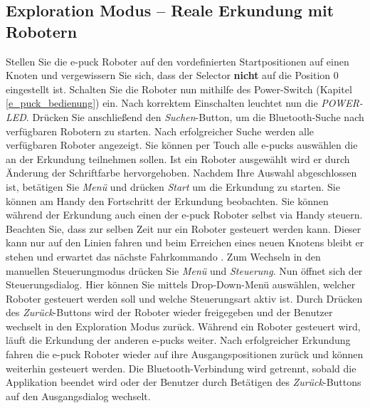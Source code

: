 \documentclass[10pt,a4paper]{article}
\begin{document}
	\subsection{Exploration Modus -- Reale Erkundung mit Robotern}
	\label{subsec:reale_erkundung}
		Stellen Sie die e-puck Roboter auf den vordefinierten Startpositionen auf einen Knoten und vergewissern Sie sich, dass der Selector \textbf{nicht} auf die Position 			0	eingestellt ist. Schalten Sie die Roboter nun mithilfe des Power-Switch (Kapitel \ref{e_puck_bedienung}) ein. Nach korrektem Einschalten leuchtet nun die 
		\textit{POWER-LED}. Dr\"ucken Sie anschlie\ss end den \textit{Suchen}-Button, um die Bluetooth-Suche nach verf\"ugbaren Robotern zu starten. Nach 								erfolgreicher	Suche werden alle verf\"ugbaren Roboter angezeigt. Sie k\"onnen per Touch alle e-pucks ausw\"ahlen die an der Erkundung teilnehmen sollen. Ist 					ein Roboter ausgew\"ahlt wird er durch \"Anderung der Schriftfarbe hervorgehoben. Nachdem Ihre Auswahl abgeschlossen ist, bet\"atigen Sie \textit{Men\"u} 					und dr\"ucken  \textit{Start} um die Erkundung zu starten. Sie k\"onnen am Handy den Fortschritt der Erkundung beobachten. Sie k\"onnen w\"ahrend der
		Erkundung auch einen der e-puck Roboter selbst via Handy steuern. Beachten Sie, dass zur selben Zeit nur ein Roboter gesteuert werden kann. Dieser kann nur
		auf den  Linien fahren und beim Erreichen eines neuen Knotens bleibt er stehen und erwartet das n\"achste Fahrkommando . Zum Wechseln in den manuellen 
		Steuerungmodus dr\"ucken Sie \textit{Men\"u} und \textit{Steuerung}. Nun \"offnet sich der Steuerungsdialog. Hier k\"onnen Sie mittels Drop-Down-Men\"u 
		ausw\"ahlen, welcher Roboter gesteuert werden soll und welche Steuerungsart aktiv ist. Durch Dr\"ucken des \textit{Zur\"uck}-Buttons wird der Roboter wieder
		freigegeben und der Benutzer wechselt in den Exploration Modus zur\"uck. W\"ahrend ein Roboter gesteuert wird, l\"auft die Erkundung der anderen e-pucks
		weiter. Nach erfolgreicher Erkundung fahren die e-puck Roboter wieder auf ihre Ausgangspositionen zur\"uck und k\"onnen weiterhin gesteuert werden. Die
		Bluetooth-Verbindung wird getrennt, sobald die Applikation beendet wird oder der Benutzer durch Bet\"atigen des \textit{Zur\"uck}-Buttons auf den 
		Ausgangsdialog wechselt.
\end{document}
